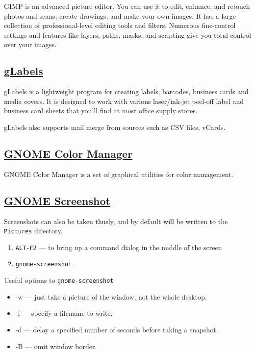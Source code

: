  GIMP is an advanced picture editor. You can use it to edit, enhance, and
 retouch photos and scans, create drawings, and make your own images.
 It has a large collection of professional-level editing tools and
 filters. Numerous
 fine-control settings and features like layers, paths, masks, and
 scripting give you total control over your images.
 
\subsection{\href{http://glabels.sourceforge.net/}{gLabels}}

 gLabels is a lightweight program for creating labels, barcodes, business
 cards and media covers. It is designed to
 work with various laser/ink-jet peel-off label and business card sheets that
 you'll find at most office supply stores.
 
 gLabels also supports mail merge from sources such as CSV files, vCards.

\subsection{\href{https://git.gnome.org/browse/gnome-color-manager}{GNOME Color Manager}}

 GNOME Color Manager is a set of graphical utilities for color
 management.

\subsection{\href{}{GNOME Screenshot}}
Screenshots can also be taken thusly, and by default will be written to the
\texttt{Pictures} directory.

\begin{enumerate}
 \item\texttt{ALT-F2} --- to bring up a command dialog in the middle of the screen
 \item\texttt{gnome-screenshot}
\end{enumerate}

Useful options to \texttt{gnome-screenshot} 
\begin{itemize}
 \item{-w} --- just take a picture of the window, not the whole desktop.
 \item{-f} --- specify a filename to write.
 \item{-d} --- delay a specified number of seconds before taking a snapshot.
 \item{-B} --- omit window border.
\end{itemize}

